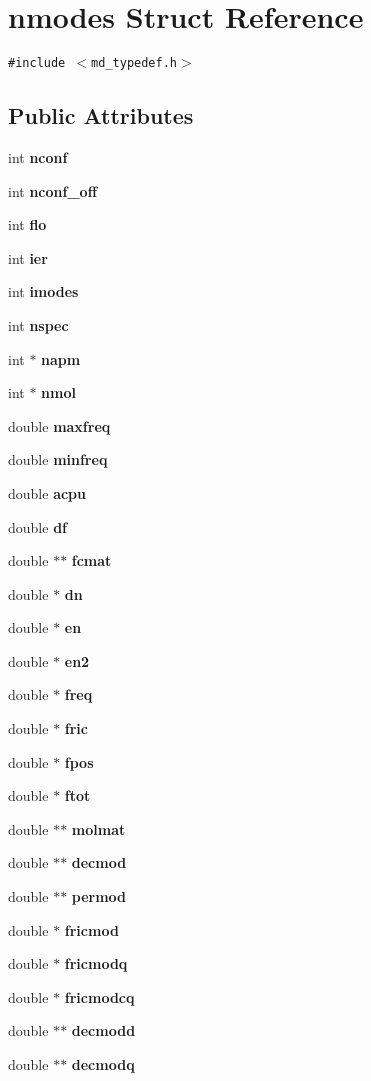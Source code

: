 \section{nmodes Struct Reference}
\label{structnmodes}
{\tt \#include $<$md\_\-typedef.h$>$}

\subsection*{Public Attributes}
\begin{CompactItemize}
\item 
int {\bf nconf}
\item 
int {\bf nconf\_\-off}
\item 
int {\bf flo}
\item 
int {\bf ier}
\item 
int {\bf imodes}
\item 
int {\bf nspec}
\item 
int $\ast$ {\bf napm}
\item 
int $\ast$ {\bf nmol}
\item 
double {\bf maxfreq}
\item 
double {\bf minfreq}
\item 
double {\bf acpu}
\item 
double {\bf df}
\item 
double $\ast$$\ast$ {\bf fcmat}
\item 
double $\ast$ {\bf dn}
\item 
double $\ast$ {\bf en}
\item 
double $\ast$ {\bf en2}
\item 
double $\ast$ {\bf freq}
\item 
double $\ast$ {\bf fric}
\item 
double $\ast$ {\bf fpos}
\item 
double $\ast$ {\bf ftot}
\item 
double $\ast$$\ast$ {\bf molmat}
\item 
double $\ast$$\ast$ {\bf decmod}
\item 
double $\ast$$\ast$ {\bf permod}
\item 
double $\ast$ {\bf fricmod}
\item 
double $\ast$ {\bf fricmodq}
\item 
double $\ast$ {\bf fricmodcq}
\item 
double $\ast$$\ast$ {\bf decmodd}
\item 
double $\ast$$\ast$ {\bf decmodq}
\item 

\end{CompactItemize}
